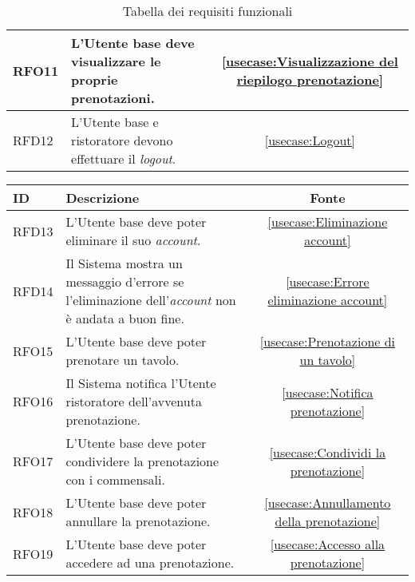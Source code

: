 \begin{table}[H]
\begin{tabularx}{\textwidth}{l|X|c}
		\hline
		RFO11       & L'Utente base deve visualizzare le proprie prenotazioni.						                                            &  \autoref{usecase:Visualizzazione del riepilogo prenotazione}           \\
		\hline
		RFD12       & L'Utente base e ristoratore devono effettuare il \textit{logout}.                                                        					& \autoref{usecase:Logout}            \\
\end{tabularx}
\caption{Tabella dei requisiti funzionali}
\end{table}

\begin{table}[H]
	\renewcommand{\arraystretch}{1.5}
	\centering
	\begin{tabularx}{\textwidth}{l|X|c}
		\textbf{ID} & \textbf{Descrizione}                                                                                                      & \textbf{Fonte} \\
		\hline
		RFD13       & L'Utente base deve poter eliminare il suo \textit{account}.                                                          			&  \autoref{usecase:Eliminazione account}           \\
		\hline
		RFD14       & Il Sistema mostra un messaggio d'errore se l'eliminazione dell'\textit{account} non è andata a buon fine.                       & \autoref{usecase:Errore eliminazione account}            \\
		\hline
		RFO15       & L'Utente base deve poter prenotare un tavolo.                                                    								 & \autoref{usecase:Prenotazione di un tavolo}            \\
		\hline
		RFO16       & Il Sistema notifica l'Utente ristoratore dell'avvenuta prenotazione.                                                 			&  \autoref{usecase:Notifica prenotazione}           \\
		\hline
		RFO17       & L'Utente base deve poter condividere la prenotazione con i commensali.        												& \autoref{usecase:Condividi la prenotazione}            \\
		\hline
		RFO18       & L'Utente base deve poter annullare la prenotazione. 																			&  \autoref{usecase:Annullamento della prenotazione}           \\
		\hline
		RFO19       & L'Utente base deve poter accedere ad una prenotazione.						                                                 & \autoref{usecase:Accesso alla prenotazione}            \\

\end{tabularx}
\end{table}
